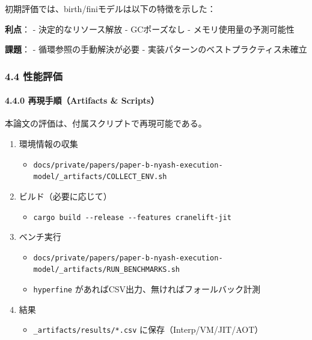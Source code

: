 \documentclass[
]{article}
\providecommand{\tightlist}{%
  \setlength{\itemsep}{0pt}\setlength{\parskip}{0pt}}
\begin{document}
初期評価では、birth/finiモデルは以下の特徴を示した：

\textbf{利点}： - 決定的なリソース解放 - GCポーズなし -
メモリ使用量の予測可能性

\textbf{課題}： - 循環参照の手動解決が必要 -
実装パターンのベストプラクティス未確立

\hypertarget{ux6027ux80fdux8a55ux4fa1}{%
\subsubsection{4.4 性能評価}\label{ux6027ux80fdux8a55ux4fa1}}

\hypertarget{ux518dux73feux624bux9806artifacts-scripts}{%
\paragraph{4.4.0 再現手順（Artifacts \&
Scripts）}\label{ux518dux73feux624bux9806artifacts-scripts}}

本論文の評価は、付属スクリプトで再現可能である。

\begin{enumerate}
\def\labelenumi{\arabic{enumi}.}
\tightlist
\item
  環境情報の収集

  \begin{itemize}
  \tightlist
  \item
    \texttt{docs/private/papers/paper-b-nyash-execution-model/\_artifacts/COLLECT\_ENV.sh}
  \end{itemize}
\item
  ビルド（必要に応じて）

  \begin{itemize}
  \tightlist
  \item
    \texttt{cargo\ build\ -\/-release\ -\/-features\ cranelift-jit}
  \end{itemize}
\item
  ベンチ実行

  \begin{itemize}
  \tightlist
  \item
    \texttt{docs/private/papers/paper-b-nyash-execution-model/\_artifacts/RUN\_BENCHMARKS.sh}
  \item
    \texttt{hyperfine} があればCSV出力、無ければフォールバック計測
  \end{itemize}
\item
  結果

  \begin{itemize}
  \tightlist
  \item
    \texttt{\_artifacts/results/*.csv} に保存（Interp/VM/JIT/AOT）
  \end{itemize}
\end{enumerate}
\end{document}
